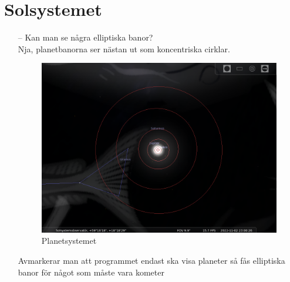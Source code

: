 \documentclass[./exercises.tex]{subfiles}
\begin{document}
\section{Solsystemet}
\begin{itemize}
    \item[--] Kan man se några elliptiska banor?\\
Nja, planetbanorna ser nästan ut som koncentriska cirklar.

\begin{figure}[H]
\centering
  \includegraphics[scale=0.35]{stellarium-003.png}
  \caption{Planetsystemet}
  \label{fig4}
\end{figure}
Avmarkerar man att programmet endast ska visa planeter så fås elliptiska banor för något som
måste vara kometer


\end{itemize}
\end{document}
